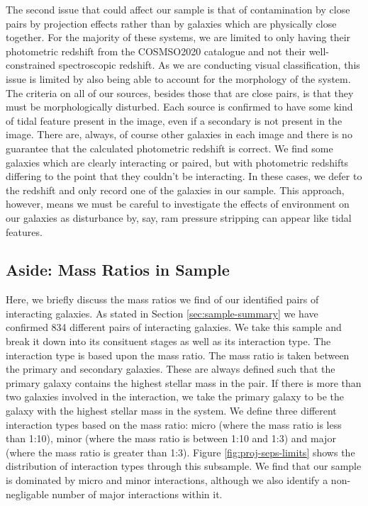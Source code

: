 The second issue that could affect our sample is that of contamination by close pairs by projection effects rather than by galaxies which are physically close together. For the majority of these systems, we are limited to only having their photometric redshift from the COSMSO2020 catalogue and not their well-constrained spectroscopic redshift. As we are conducting visual classification, this issue is limited by also being able to account for the morphology of the system. The criteria on all of our sources, besides those that are close pairs, is that they must be morphologically disturbed. Each source is confirmed to have some kind of tidal feature present in the image, even if a secondary is not present in the image. There are, always, of course other galaxies in each image and there is no guarantee that the calculated photometric redshift is correct. We find some galaxies which are clearly interacting or paired, but with photometric redshifts differing to the point that they couldn't be interacting. In these cases, we defer to the redshift and only record one of the galaxies in our sample. This approach, however, means we must be careful to investigate the effects of environment on our galaxies as disturbance by, say, ram pressure stripping can appear like tidal features.

\subsection{Aside: Mass Ratios in Sample}
Here, we briefly discuss the mass ratios we find of our identified pairs of interacting galaxies. As stated in Section \ref{sec:sample-summary} we have confirmed 834 different pairs of interacting galaxies. We take this sample and break it down into its consituent stages as well as its interaction type. The interaction type is based upon the mass ratio. The mass ratio is taken between the primary and secondary galaxies. These are always defined such that the primary galaxy contains the highest stellar mass in the pair. If there is more than two galaxies involved in the interaction, we take the primary galaxy to be the galaxy with the highest stellar mass in the system. We define three different interaction types based on the mass ratio: micro (where the mass ratio is less than 1:10), minor (where the mass ratio is between 1:10 and 1:3) and major (where the mass ratio is greater than 1:3). Figure \ref{fig:proj-seps-limits} shows the distribution of interaction types through this subsample. We find that our sample is dominated by micro and minor interactions, although we also identify a non-negligable number of major interactions within it.

